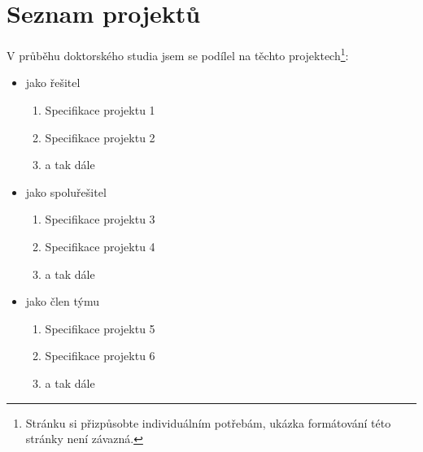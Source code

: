 \chapter*{Seznam projektů}
\label{sec:ListOfProjects}
V průběhu doktorského studia jsem se podílel na těchto projektech\footnote{Stránku si přizpůsobte individuálním potřebám, ukázka formátování této stránky není závazná.}:
\begin{itemize}
	\item jako řešitel
		\begin{enumerate}
			\item Specifikace projektu 1
			\item Specifikace projektu 2
			\item a tak dále
		\end{enumerate}

	\item jako spoluřešitel
		\begin{enumerate}[resume]
			\item Specifikace projektu 3
			\item Specifikace projektu 4
			\item a tak dále
		\end{enumerate}

	\item jako člen týmu
		\begin{enumerate}[resume]
			\item Specifikace projektu 5
			\item Specifikace projektu 6
			\item a tak dále
		\end{enumerate}
\end{itemize}

\endinput
